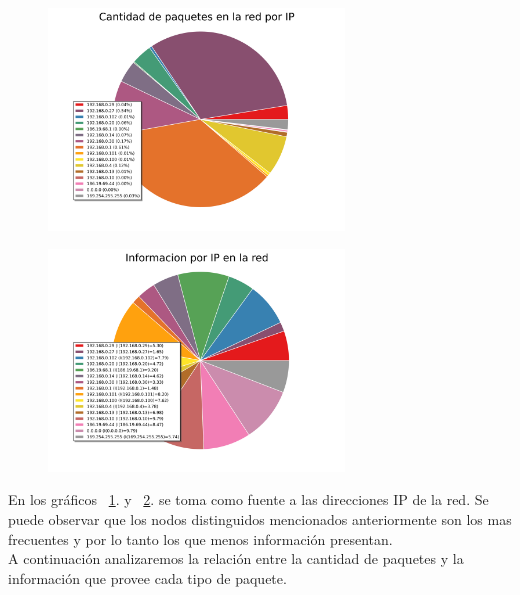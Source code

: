 \begin{figure}[h!]
  \centering
   \includegraphics[width=0.7\textwidth]{graficos/red_domestica_pie_arp.png}
  \caption{}
  \label{fig:red_domestica_pie_arp}
\end{figure}

\begin{figure}[h!]
  \centering
   \includegraphics[width=0.7\textwidth]{graficos/red_domestica_pie_arp_information.png}
  \caption{}
  \label{fig:red_domestica_pie_arp_information}
\end{figure}

En los gráficos ~\ref{fig:red_domestica_pie_arp}. y ~\ref{fig:red_domestica_pie_arp_information}. se toma como fuente a las direcciones IP de la red.
Se puede observar que los nodos distinguidos mencionados anteriormente son los mas frecuentes y por lo tanto los que menos información presentan.
\\
A continuación analizaremos la relación entre la cantidad de paquetes y la información que provee cada tipo de paquete.


